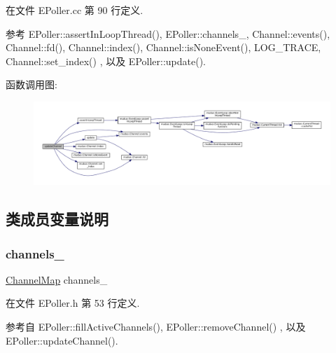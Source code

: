 在文件 E\+Poller.\+cc 第 90 行定义.



参考 E\+Poller\+::assert\+In\+Loop\+Thread(), E\+Poller\+::channels\+\_\+, Channel\+::events(), Channel\+::fd(), Channel\+::index(), Channel\+::is\+None\+Event(), L\+O\+G\+\_\+\+T\+R\+A\+CE, Channel\+::set\+\_\+index() , 以及 E\+Poller\+::update().

函数调用图\+:
\nopagebreak
\begin{figure}[H]
\begin{center}
\leavevmode
\includegraphics[width=350pt]{classmuduo_1_1EPoller_acaa4a191936aacf608d279a6f343d533_cgraph}
\end{center}
\end{figure}


\subsection{类成员变量说明}
\mbox{\label{classmuduo_1_1EPoller_aca6f39ba1cb9dbdd28edf2291d1b4fd5}} 
\subsubsection{\texorpdfstring{channels\+\_\+}{channels\_}}
{\footnotesize\ttfamily \hyperlink{classmuduo_1_1EPoller_a950db725d18ce33d8457ae784380a07e}{Channel\+Map} channels\+\_\+\hspace{0.3cm}{\ttfamily [private]}}



在文件 E\+Poller.\+h 第 53 行定义.



参考自 E\+Poller\+::fill\+Active\+Channels(), E\+Poller\+::remove\+Channel() , 以及 E\+Poller\+::update\+Channel().

\mbox{\label{classmuduo_1_1EPoller_a942c2940f17cc0c7cbd918424bd6f263}} 
